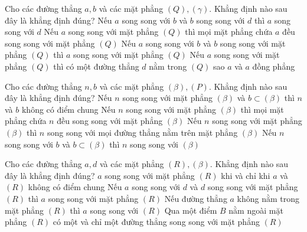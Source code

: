 \documentclass[12pt,a4paper]{article}
\begin{document}
\begin{ex}
	Cho các đường thẳng ${a,b}$ và các mặt phẳng ${(Q), (\gamma)}$. Khẳng định nào sau đây là khẳng định đúng? 
	\choice
	{ Nếu ${a}$ song song với ${b}$ và ${b}$ song song với ${d}$ thì ${a}$ song song với ${d}$ }
	{ Nếu ${a}$ song song với mặt phẳng ${(Q)}$ thì mọi mặt phẳng chứa ${a}$ đều song song với mặt phẳng ${(Q)}$ }
	{ Nếu ${a}$ song song với ${b}$ và ${b}$ song song với mặt phẳng ${(Q)}$ thì ${a}$ song song với mặt phẳng ${(Q)}$ }
	{ \True Nếu ${a}$ song song với mặt phẳng ${(Q)}$ thì có một đường thẳng ${d}$ nằm trong ${(Q)}$ sao ${a}$ và ${a}$ đồng phẳng }
	\end{ex}

\begin{ex}
	Cho các đường thẳng ${n,b}$ và các mặt phẳng ${(\beta), (P)}$. Khẳng định nào sau đây là khẳng định đúng? 
	\choice
	{ \True Nếu ${n}$ song song với mặt phẳng ${(\beta)}$ và $b\subset (\beta)$ thì ${n}$ và ${b}$ không có điểm chung }
	{ Nếu ${n}$ song song với mặt phẳng ${(\beta)}$ thì mọi mặt phẳng chứa ${n}$ đều song song với mặt phẳng ${(\beta)}$ }
	{ Nếu ${n}$ song song với mặt phẳng ${(\beta)}$ thì ${n}$ song song với mọi đường thẳng nằm trên mặt phẳng ${(\beta)}$ }
	{ Nếu ${n}$ song song với ${b}$ và $b\subset (\beta)$ thì ${n}$ song song với ${(\beta)}$ }
	\end{ex}

\begin{ex}
	Cho các đường thẳng ${a,d}$ và các mặt phẳng ${(R), (\beta)}$. Khẳng định nào sau đây là khẳng định đúng? 
	\choice
	{ \True ${a}$ song song với mặt phẳng ${(R)}$ khi và chỉ khi ${a}$ và ${(R)}$ không có điểm chung }
	{ Nếu ${a}$ song song với ${d}$ và ${d}$ song song với mặt phẳng ${(R)}$ thì ${a}$ song song với mặt phẳng ${(R)}$ }
	{ Nếu đường thẳng ${a}$ không nằm trong mặt phẳng ${(R)}$ thì ${a}$ song song với ${(R)}$ }
	{ Qua một điểm ${B}$ nằm ngoài mặt phẳng ${(R)}$ có một và chỉ một đường thẳng song song với mặt phẳng ${(R)}$ }
	\end{ex}
\end{document}
